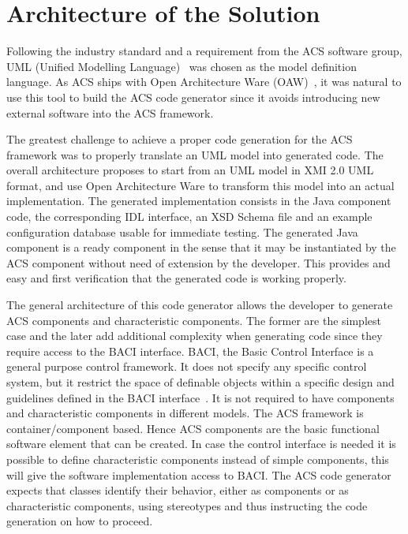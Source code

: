 \chapter{Architecture of the Solution}
\label{ch:architecture}
Following the industry standard and a requirement from
the ACS software group,
UML (Unified Modelling Language)~\cite{UML-WEB} was chosen as the model definition language.
As ACS ships with Open Architecture Ware (OAW)~\cite{OAW-WEB}, it was natural to use
this tool to build the ACS code generator
since it avoids introducing new external
software into the ACS framework.

The greatest challenge to achieve a proper code generation for the ACS framework
was to properly translate an UML model into generated code.
The overall architecture proposes to start from
an UML model in XMI 2.0 UML~\cite{OMG-WEB} format,
and use Open Architecture Ware to transform this model into an actual implementation.
The generated implementation consists in
the Java component code,
the corresponding IDL interface,
an XSD Schema file
and
an example configuration database usable for immediate testing.
The generated Java component is a ready component
in the sense that it may be instantiated
by the ACS component without need of extension by the developer.
This provides and easy and first verification that the generated code is working properly.

The general architecture of this code generator
allows the developer to generate ACS
components and
characteristic components.
The former are the simplest case and the later add
additional complexity when generating code
since they require access to the BACI interface.
BACI, the Basic Control Interface
is a general purpose control framework.
It does not specify any specific control system,
but it restrict the space of definable objects
within a specific design and guidelines defined
in the BACI interface~\cite{plesko05:_baci}.
It is not required to have components and characteristic components
in different models.
The ACS framework is container/component based.
Hence ACS components are the basic
functional software element that can be created.
In case the control interface is needed
it is possible to define characteristic components
instead of simple components,
this will give the software implementation
access to BACI.
The ACS code generator
expects that classes identify their
behavior, either as components or as characteristic components,
using stereotypes and thus instructing the
code generation on how to proceed.


